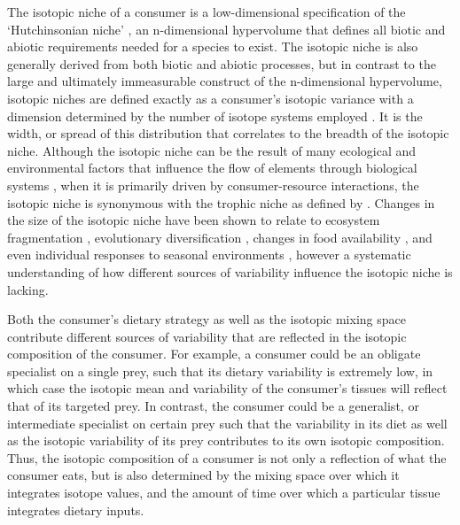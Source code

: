 \documentclass{article}
\begin{document}
The isotopic niche of a consumer is a low-dimensional specification of the `Hutchinsonian niche' \citep{Hutchinson:1957tg}, an n-dimensional hypervolume that defines all biotic and abiotic requirements needed for a species to exist.
The isotopic niche is also generally derived from both biotic and abiotic processes, but in contrast to the large and ultimately immeasurable construct of the n-dimensional hypervolume, isotopic niches are defined exactly as a consumer's isotopic variance with a dimension determined by the number of isotope systems employed \citep{Bearhop:2004im,Newsome:2007tz,Newsome:WhhVfocb,delRio:2011p2553,Jackson:2011kd}.
It is the width, or spread of this distribution that correlates to the breadth of the isotopic niche.
Although the isotopic niche can be the result of many ecological and environmental factors that influence the flow of elements through biological systems \citep{Araujo:2007iua}, when it is primarily driven by consumer-resource interactions, the isotopic niche is synonymous with the trophic niche as defined by \citet{Bearhop:2004im}.
Changes in the size of the isotopic niche have been shown to relate to ecosystem fragmentation \citep{Layman:2007ky}, evolutionary diversification \citep{Fedosov:2014hm}, changes in food availability \citep{Lehmann:2015db}, and even individual responses to seasonal environments \citep{delRio:2011p2553}, however a systematic understanding of how different sources of variability influence the isotopic niche is lacking.


Both the consumer's dietary strategy as well as the isotopic mixing space contribute different sources of variability that are reflected in the isotopic composition of the consumer.
For example, a consumer could be an obligate specialist on a single prey, such that its dietary variability is extremely low, in which case the isotopic mean and variability of the consumer's tissues will reflect that of its targeted prey.
In contrast, the consumer could be a generalist, or intermediate specialist on certain prey such that the variability in its diet as well as the isotopic variability of its prey contributes to its own isotopic composition.
Thus, the isotopic composition of a consumer is not only a reflection of what the consumer eats, but is also determined by the mixing space over which it integrates isotope values, and the amount of time over which a particular tissue integrates dietary inputs.
\end{document}

